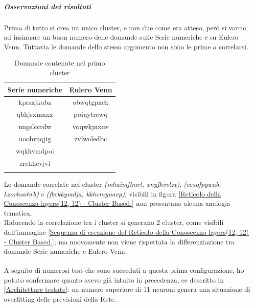 \subparagraph{Osservazioni dei risultati}\mbox{}
\noindent
Prima di tutto si crea un unico cluster, e non due come era atteso, però si vanno ad insinuare un buon numero delle domande sulle Serie numeriche e su Eulero Venn. Tuttavia le domande dello stesso argomento non sono le prime a correlarsi.
\begin{longtable}{|c|c|}
	\hline
	\textbf{Serie numeriche} & \textbf{Eulero Venn} \\\hline\hline
	kprsxjkubz & obwqtgpxek \\
	qbhjsxmnxx & poiuytrewq \\
	ungslccrdw & voqwkjnxuv \\ 
	uoohruqjig & zvlwoledbc \\
	wqkhvmdpol & \\
	zrehhcvjvl & \\
\hline
\caption{Domande contenute nel primo cluster}\label{tab:Domande contenute nel primo cluster}
\end{longtable}
\noindent
Le domande correlate nei cluster \textit{(mhaimflmrt, xnyfhvvlzx)}, \textit{(ccsofpywab, kzorhoohrb)} e \textit{(fbekkymdja, kkhcmynavp)}, visibili in figura \ref{Reticolo della Conoscenza layers(12, 12) - Cluster Based.}  non presentano alcuna analogia tematica. \\
Riducendo la correlazione tra i cluster si generano 2 cluster, come visibili dall'immagine \ref{Sequenza di creazione del Reticolo della Conoscenza layers(12, 12) - Cluster Based.}; ma nuovamente non viene rispettata la differenziazione tra domande Serie numeriche e Eulero Venn.\\\\
A seguito di numerosi test che sono succeduti a questa prima configurazione, ho potuto confermare quanto avevo gi\`a intuito in precedenza, ee descritto in \ref{Architetture testate}: un numero superiore di 11 neuroni genera una situazione di overfitting delle previsioni della Rete.

